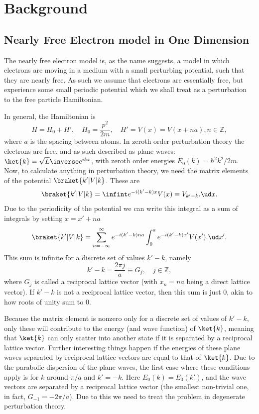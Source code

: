 \documentclass[main.tex]{subfiles}
\begin{document}
	
	\section{Background}
	\subsection{Nearly Free Electron model in One Dimension}\label{sec:nearly_free}
	The nearly free electron model is, as the name suggests, a model in which electrons are moving in a medium with a small perturbing potential, such that they are nearly free. As such we assume that electrons are essentially free, but experience some small periodic potential which we shall treat as a perturbation to the free particle Hamiltonian.
	
	In general, the Hamiltonian is
	\begin{equation}
		H = H_0 + H', \quad H_0 = \frac{p^2}{2m}, \quad H' = V(x) = V(x + na), n \in \mathbb{Z},
	\end{equation}
	where $ a $ is the spacing between atoms. In zeroth order perturbation theory the electrons are free, and as such described as plane waves: $ \ket{k} = \sqrt{L}\inverse e^{ikx} $, with zeroth order energies $ E_0(k)= \hbar^2 k^2/2m $. Now, to calculate anything in perturbation theory, we need the matrix elements of the potential $ \braket{k' | V | k} $. These are
	\begin{equation}
		\braket{k' | V | k} = \infint e^{-i(k'-k)x} V(x) \equiv V_{k'-k}.\ud x.
	\end{equation}
	Due to the periodicity of the potential we can write this integral as a sum of integrals by setting $ x=x'+na $
	\begin{equation}
		\braket{k' | V | k} = \sum_{n = -\infty}^{\infty} e^{-i(k'-k) na} \int_{0}^{a} e^{-i(k'-k)x'} V(x').\ud x'.
	\end{equation}
	This sum is infinite for a discrete set of values $ k'-k $, namely
	\begin{equation}
		k'-k = \frac{2\pi j}{a} \equiv G_j, \quad j \in \mathbb{Z},
	\end{equation}
	where $ G_j $ is called a reciprocal lattice vector (with $ x_n=na $ being a direct lattice vector). If $ k'-k $ is not a reciprocal lattice vector, then this sum is just 0, akin to how roots of unity sum to 0.
	
	Because the matrix element is nonzero only for a discrete set of values of $ k'-k $, only these will contribute to the energy (and wave function) of $ \ket{k} $, meaning that $ \ket{k} $ can only scatter into another state if it is separated by a reciprocal lattice vector. Further interesting things happen if the energies of these plane waves separated by reciprocal lattice vectors are equal to that of $ \ket{k} $. Due to the parabolic dispersion of the plane waves, the first case where these conditions apply is for $ k $ around $ \pi/a $ and $ k'=-k$. Here $ E_0(k) = E_0(k') $, and the wave vectors are separated by a reciprocal lattice vector (the smallest non-trivial one, in fact, $ G_{-1}=-2\pi/a $). Due to this we need to treat the problem in degenerate perturbation theory.
	
\end{document}
